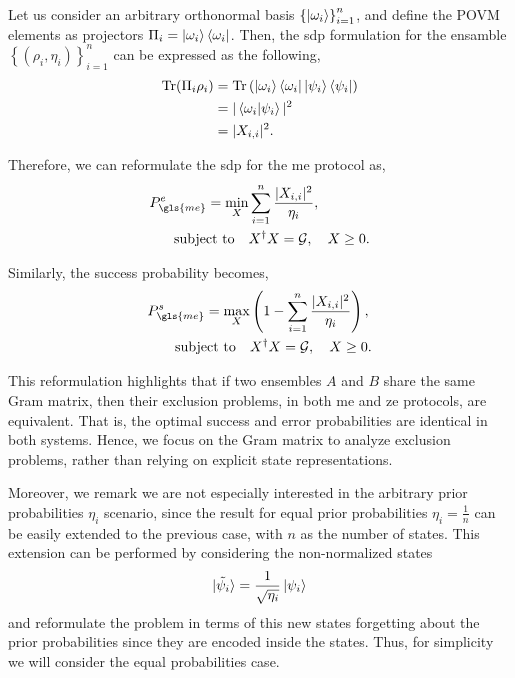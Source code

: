 \documentclass[12pt,letterpaper]{article}
\DeclareMathOperator{\tr}{Tr}
\begin{document}
\begin{multicols}{2}
Let us consider an arbitrary orthonormal basis $\left\{\ket{\omega_i}\right\}_{i=1}^n$, and define the POVM elements as projectors $\Pi_i = \ket{\omega_i}\bra{\omega_i}$. Then, the \gls{sdp} formulation for the ensamble $\left\{(\rho_i,\eta_i)\right\}_{i=1}^n$ can be expressed as the following,
\begin{align*}
	\tr(\Pi_i \rho_i) &= \tr\left( \ket{\omega_i}\bra{\omega_i} \ket{\psi_i}\bra{\psi_i} \right) \\
	&= |\braket{\omega_i|\psi_i}|^2 \\
	&= |X_{i,i}|^2.
\end{align*}

Therefore, we can reformulate the \gls{sdp} for the \gls{me} protocol as,
\begin{align*}
	P_{\gls{me}}^e = \min_{X} &\sum_{i=1}^n \frac{|X_{i,i}|^2}{\eta_i},\\
	\text{subject to} \quad & X^\dagger X = \mathcal{G}, \quad X \geq 0.
\end{align*}

Similarly, the success probability becomes, 
\begin{align*}
	P_{\gls{me}}^s = \max_{X} &\left(1 - \sum_{i=1}^n \frac{|X_{i,i}|^2}{\eta_i}\right),\\
	\text{subject to} \quad & X^\dagger X = \mathcal{G}, \quad X \geq 0.
\end{align*}

This reformulation highlights that if two ensembles $A$ and $B$ share the same Gram matrix, then their exclusion problems, in both \gls{me} and \gls{ze} protocols, are equivalent. That is, the optimal success and error probabilities are identical in both systems. Hence, we focus on the Gram matrix to analyze exclusion problems, rather than relying on explicit state representations.

Moreover, we remark we are not especially interested in the arbitrary prior probabilities $\eta_i$ scenario, since the result for equal prior probabilities $\eta_i=\frac{1}{n}$ can be easily extended to the previous case, with $n$ as the number of states. This extension can be performed by considering the non-normalized states
\begin{align*}
	\ket{\tilde{\psi_i}}=\frac{1}{\sqrt{\eta_i}}\ket{\psi_i}
\end{align*}
and reformulate the problem in terms of this new states forgetting about the prior probabilities since they are encoded inside the states. Thus, for simplicity we will consider the equal probabilities case.


\end{multicols}
\end{document}
